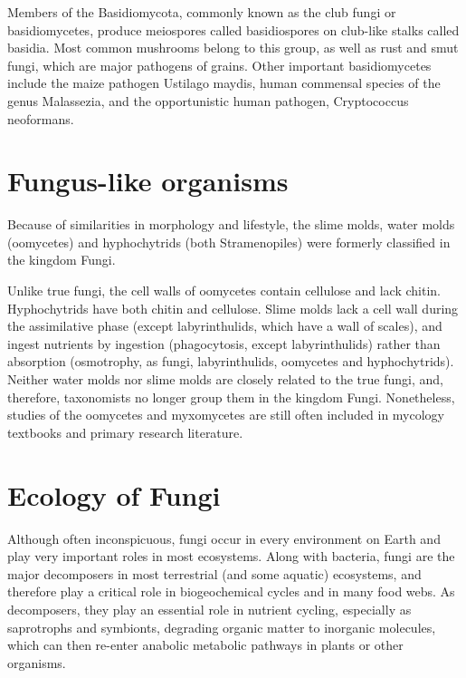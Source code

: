 Members of the Basidiomycota, commonly known as the club fungi or basidiomycetes, produce meiospores called basidiospores on club-like stalks called basidia. Most common mushrooms belong to this group, as well as rust and smut fungi, which are major pathogens of grains. Other important basidiomycetes include the maize pathogen Ustilago maydis, human commensal species of the genus Malassezia, and the opportunistic human pathogen, Cryptococcus neoformans.

\hypertarget{fungus-like-organisms}{%
\section{Fungus-like organisms}\label{fungus-like-organisms}}

Because of similarities in morphology and lifestyle, the slime molds, water molds (oomycetes) and hyphochytrids (both Stramenopiles) were formerly classified in the kingdom Fungi.

Unlike true fungi, the cell walls of oomycetes contain cellulose and lack chitin. Hyphochytrids have both chitin and cellulose. Slime molds lack a cell wall during the assimilative phase (except labyrinthulids, which have a wall of scales), and ingest nutrients by ingestion (phagocytosis, except labyrinthulids) rather than absorption (osmotrophy, as fungi, labyrinthulids, oomycetes and hyphochytrids). Neither water molds nor slime molds are closely related to the true fungi, and, therefore, taxonomists no longer group them in the kingdom Fungi. Nonetheless, studies of the oomycetes and myxomycetes are still often included in mycology textbooks and primary research literature.

\hypertarget{ecology-of-fungi}{%
\section{Ecology of Fungi}\label{ecology-of-fungi}}

Although often inconspicuous, fungi occur in every environment on Earth and play very important roles in most ecosystems. Along with bacteria, fungi are the major decomposers in most terrestrial (and some aquatic) ecosystems, and therefore play a critical role in biogeochemical cycles and in many food webs. As decomposers, they play an essential role in nutrient cycling, especially as saprotrophs and symbionts, degrading organic matter to inorganic molecules, which can then re-enter anabolic metabolic pathways in plants or other organisms.

